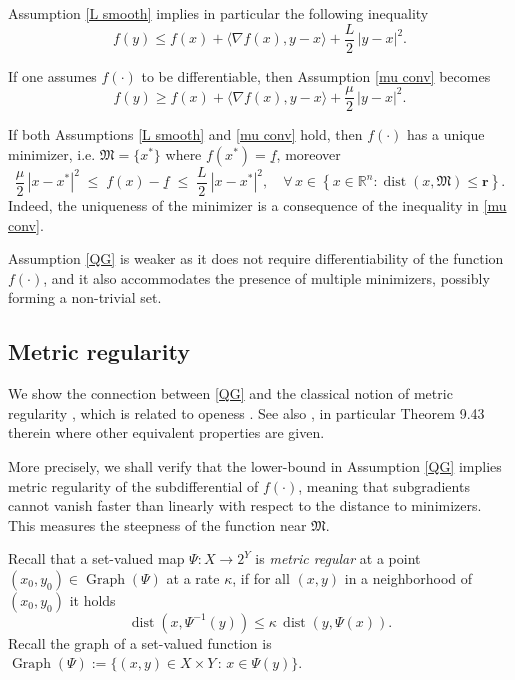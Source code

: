 \documentclass[12pt]{amsart}
\numberwithin{equation}{section}
\theoremstyle{plain}
\begin{document}
Assumption \ref{L smooth} implies in particular the following inequality
\begin{equation*}
    f(y) \leq f(x) + \langle \nabla f(x), y-x\rangle + \frac{L}{2}\,|y-x|^{2}.
\end{equation*}

If one assumes $f(\cdot)$ to be differentiable, then Assumption \ref{mu conv} becomes
\begin{equation*}
    f(y) \geq f(x) + \langle \nabla f(x), y-x\rangle + \frac{\mu}{2}\,|y-x|^{2}.
\end{equation*}

If both Assumptions \ref{L smooth} and \ref{mu conv} hold, then $f(\cdot)$ has a unique minimizer, i.e. $\mathfrak{M}=\{x^{*}\}$ where $f(x^{*})=\underline{f}$, moreover 
\begin{equation*}
   \frac{\mu}{2}\,|x-x^{*}|^{2} \;\leq\; f(x) - \underline{f} \;\leq\; \frac{L}{2}\ |x-x^{*}|^{2}, \quad\forall\,x \in \left\{x\in\mathbb{R}^{n}: \operatorname{dist}(x,\mathfrak{M})\leq \mathbf{r}\right\}.
\end{equation*}
Indeed, the uniqueness of the minimizer is a consequence of the inequality in \ref{mu conv}.


Assumption \ref{QG} is weaker as it does not require differentiability of the function 
$f(\cdot)$, and it also accommodates the presence of multiple minimizers, possibly forming a non-trivial set.


\subsection{Metric regularity}

We show the connection between \ref{QG} and the classical notion of metric regularity \cite[Definition 2.80, p. 58]{bonnans2013perturbation}, which is related to openess \cite[Theorem 2.81, p. 58]{bonnans2013perturbation}. See also \cite[Chapter 9, \S G]{rockafellar1998variational}, in particular Theorem 9.43 therein where other equivalent properties are given. 

More precisely, we shall verify that the lower-bound in Assumption \ref{QG} implies metric regularity of the subdifferential of $f(\cdot)$, meaning that subgradients cannot vanish faster than linearly with respect to the distance to minimizers. This measures the steepness of the function near $\mathfrak{M}$. 

Recall that a set-valued map $\Psi: X \to 2^{Y}$ is \textit{metric regular} at a point $(x_{0}, y_{0}) \in \operatorname{Graph}(\Psi)$ at a rate $\kappa$, if for all $(x,y)$ in a neighborhood of  $(x_{0}, y_{0})$ it holds
\begin{equation*}
    \operatorname{dist}(x,\Psi^{-1}(y)) \leq \kappa\,\operatorname{dist}(y, \Psi(x)).
\end{equation*}
Recall the graph of a set-valued function is $\operatorname{Graph}(\Psi) := \{(x,y) \in X\times Y\,:\, x\in \Psi(y)\}$. 
\end{document}
